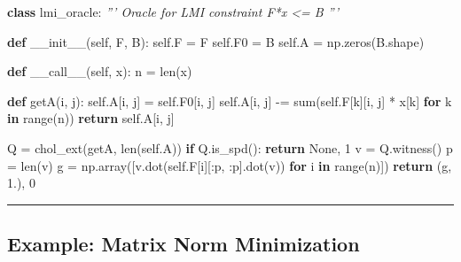 \documentclass[]{article}
\newenvironment{Shaded}{}{}
\newcommand{\BuiltInTok}[1]{#1}
\newcommand{\CommentTok}[1]{\textcolor[rgb]{0.38,0.63,0.69}{\textit{#1}}}
\newcommand{\ControlFlowTok}[1]{\textcolor[rgb]{0.00,0.44,0.13}{\textbf{#1}}}
\newcommand{\DecValTok}[1]{\textcolor[rgb]{0.25,0.63,0.44}{#1}}
\newcommand{\FloatTok}[1]{\textcolor[rgb]{0.25,0.63,0.44}{#1}}
\newcommand{\FunctionTok}[1]{\textcolor[rgb]{0.02,0.16,0.49}{#1}}
\newcommand{\KeywordTok}[1]{\textcolor[rgb]{0.00,0.44,0.13}{\textbf{#1}}}
\newcommand{\NormalTok}[1]{#1}
\newcommand{\OperatorTok}[1]{\textcolor[rgb]{0.40,0.40,0.40}{#1}}
\newcommand{\VariableTok}[1]{\textcolor[rgb]{0.10,0.09,0.49}{#1}}
\begin{document}
\begin{Shaded}
\begin{Highlighting}[]
\KeywordTok{class}\NormalTok{ lmi_oracle:}
    \CommentTok{''' Oracle for LMI constraint F*x <= B '''}

    \KeywordTok{def} \FunctionTok{__init__}\NormalTok{(}\VariableTok{self}\NormalTok{, F, B):}
        \VariableTok{self}\NormalTok{.F }\OperatorTok{=}\NormalTok{ F}
        \VariableTok{self}\NormalTok{.F0 }\OperatorTok{=}\NormalTok{ B}
        \VariableTok{self}\NormalTok{.A }\OperatorTok{=}\NormalTok{ np.zeros(B.shape)}

    \KeywordTok{def} \FunctionTok{__call__}\NormalTok{(}\VariableTok{self}\NormalTok{, x):}
\NormalTok{        n }\OperatorTok{=} \BuiltInTok{len}\NormalTok{(x)}

        \KeywordTok{def}\NormalTok{ getA(i, j):}
            \VariableTok{self}\NormalTok{.A[i, j] }\OperatorTok{=} \VariableTok{self}\NormalTok{.F0[i, j]}
            \VariableTok{self}\NormalTok{.A[i, j] }\OperatorTok{-=} \BuiltInTok{sum}\NormalTok{(}\VariableTok{self}\NormalTok{.F[k][i, j] }\OperatorTok{*}\NormalTok{ x[k]}
                                \ControlFlowTok{for}\NormalTok{ k }\KeywordTok{in} \BuiltInTok{range}\NormalTok{(n))}
            \ControlFlowTok{return} \VariableTok{self}\NormalTok{.A[i, j]}

\NormalTok{        Q }\OperatorTok{=}\NormalTok{ chol_ext(getA, }\BuiltInTok{len}\NormalTok{(}\VariableTok{self}\NormalTok{.A))}
        \ControlFlowTok{if}\NormalTok{ Q.is_spd(): }\ControlFlowTok{return} \VariableTok{None}\NormalTok{, }\DecValTok{1}
\NormalTok{        v }\OperatorTok{=}\NormalTok{ Q.witness()}
\NormalTok{        p }\OperatorTok{=} \BuiltInTok{len}\NormalTok{(v)}
\NormalTok{        g }\OperatorTok{=}\NormalTok{ np.array([v.dot(}\VariableTok{self}\NormalTok{.F[i][:p, :p].dot(v))}
                      \ControlFlowTok{for}\NormalTok{ i }\KeywordTok{in} \BuiltInTok{range}\NormalTok{(n)])}
        \ControlFlowTok{return}\NormalTok{ (g, }\FloatTok{1.}\NormalTok{), }\DecValTok{0}
\end{Highlighting}
\end{Shaded}

\begin{center}\rule{0.5\linewidth}{\linethickness}\end{center}

\hypertarget{example-matrix-norm-minimization}{%
\subsection{Example: Matrix Norm
Minimization}\label{example-matrix-norm-minimization}}
\end{document}
